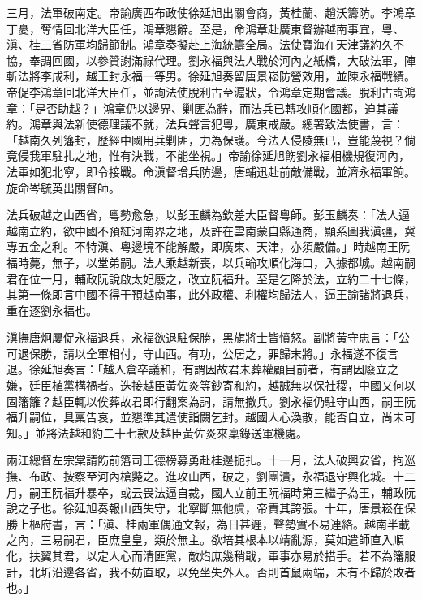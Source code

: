\begin{pinyinscope}
三月，法軍破南定。帝諭廣西布政使徐延旭出關會商，黃桂蘭、趙沃籌防。李鴻章丁憂，奪情回北洋大臣任，鴻章懇辭。至是，命鴻章赴廣東督辦越南事宜，粵、滇、桂三省防軍均歸節制。鴻章奏擬赴上海統籌全局。法使寶海在天津議約久不協，奉調回國，以參贊謝滿祿代理。劉永福與法人戰於河內之紙橋，大破法軍，陣斬法將李成利，越王封永福一等男。徐延旭奏留唐景崧防營效用，並陳永福戰績。帝促李鴻章回北洋大臣任，並詢法使脫利古至滬狀，令鴻章定期會議。脫利古詢鴻章：「是否助越？」鴻章仍以邊界、剿匪為辭，而法兵已轉攻順化國都，迫其議約。鴻章與法新使德理議不就，法兵聲言犯粵，廣東戒嚴。總署致法使書，言：「越南久列籓封，歷經中國用兵剿匪，力為保護。今法人侵陵無已，豈能蔑視？倘竟侵我軍駐扎之地，惟有決戰，不能坐視。」帝諭徐延旭飭劉永福相機規復河內，法軍如犯北寧，即令接戰。命滇督增兵防邊，唐蜅迅赴前敵備戰，並濟永福軍餉。旋命岑毓英出關督師。

法兵破越之山西省，粵勢愈急，以彭玉麟為欽差大臣督粵師。彭玉麟奏：「法人逼越南立約，欲中國不預紅河南界之地，及許在雲南蒙自縣通商，顯系圖我滇疆，冀專五金之利。不特滇、粵邊境不能解嚴，即廣東、天津，亦須嚴備。」時越南王阮福時薨，無子，以堂弟嗣。法人乘越新喪，以兵輪攻順化海口，入據都城。越南嗣君在位一月，輔政阮說啟太妃廢之，改立阮福升。至是乞降於法，立約二十七條，其第一條即言中國不得干預越南事，此外政權、利權均歸法人，逼王諭諸將退兵，重在逐劉永福也。

滇撫唐炯屢促永福退兵，永福欲退駐保勝，黑旗將士皆憤怒。副將黃守忠言：「公可退保勝，請以全軍相付，守山西。有功，公居之，罪歸末將。」永福遂不復言退。徐延旭奏言：「越人倉卒議和，有謂因故君未葬權顧目前者，有謂因廢立之嫌，廷臣植黨構禍者。迭接越臣黃佐炎等鈔寄和約，越誠無以保社稷，中國又何以固籓籬？越臣輒以俟葬故君即行翻案為詞，請無撤兵。劉永福仍駐守山西，嗣王阮福升嗣位，具稟告哀，並懇準其遣使詣闕乞封。越國人心渙散，能否自立，尚未可知。」並將法越和約二十七款及越臣黃佐炎來稟錄送軍機處。

兩江總督左宗棠請飭前籓司王德榜募勇赴桂邊扼扎。十一月，法人破興安省，拘巡撫、布政、按察至河內槍斃之。進攻山西，破之，劉團潰，永福退守興化城。十二月，嗣王阮福升暴卒，或云畏法逼自裁，國人立前王阮福時第三繼子為王，輔政阮說之子也。徐延旭奏報山西失守，北寧斷無他虞，帝責其誇張。十年，唐景崧在保勝上樞府書，言：「滇、桂兩軍偶通文報，為日甚遲，聲勢實不易連絡。越南半載之內，三易嗣君，臣庶皇皇，類於無主。欲培其根本以靖亂源，莫如遣師直入順化，扶翼其君，以定人心而清匪黨，敵焰庶幾稍戢，軍事亦易於措手。若不為籓服計，北圻沿邊各省，我不妨直取，以免坐失外人。否則首鼠兩端，未有不歸於敗者也。」


\end{pinyinscope}
